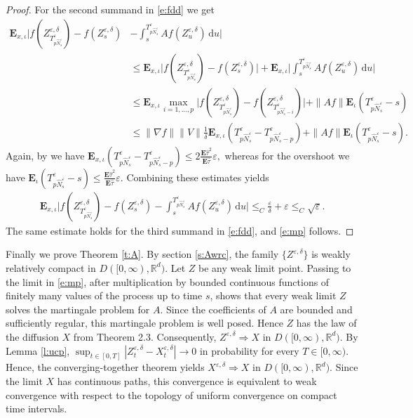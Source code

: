 \documentclass[10pt]{article}
\newcommand{\E}{\mathbf{E}}
\newcommand{\1}{1\!\!\!\;{\rm I}}
\theoremstyle{plain}
\theoremstyle{definition}
\newcommand{\e}{\varepsilon}
\newcommand{\ba}{\begin{equation}\begin{aligned}}
\newcommand{\ea}{\end{aligned}\end{equation}}
\newcommand{\di}{\mathrm{d}}
\newcommand{\bR}{\mathbb{R}}
\numberwithin{equation}{section}
\begin{document}
\begin{proof}
For the second summand in \eqref{e:fdd} we get
\ba
\E_{x,\iota}\Big|f(Z^{\e,\delta}_{T^\e_{p \widehat N^\e_s}}) - f(Z^{\e,\delta}_{s})
&- \int_{s}^{T^\e_{p \widehat N^\e_s}} Af(Z^{\e,\delta}_u)\,\di u\Big|\\
&\leq
\E_{x,\iota}\Big|f(Z^{\e,\delta}_{T^\e_{p \widehat N^\e_s}}) - f(Z^{\e,\delta}_s )\Big|
+\E_{x,\iota} \Big|\int_s^{T^\e_{p \widehat N^\e_s}} Af(Z^{\e,\delta}_u)\,\di u\Big|\\
&\leq
\E_{x,\iota}\max_{i=1,\dots,p}\Big|f(Z^{\e,\delta}_{T^\e_{p \widehat N^\e_s}}) - f(Z^{\e,\delta}_{T^\e_{p \widehat N^\e_s-i}} )\Big|
+\|Af\|\E_\iota (T^\e_{p \widehat N^\e_s}-s)\\
&\leq \|\nabla f\|\|V\|\frac{1}{\delta}\E_{x,\iota} (T^\e_{p \widehat N^\e_s}-T^\e_{p \widehat N^\e_s-p})
+\|Af\|\E_\iota (T^\e_{p \widehat N^\e_s}-s).
\ea
Again, by \cite[Section 2]{lorden1970excess} we have
$
\E_{x,\iota} (T^\e_{p \widehat N^\e_s}-T^\e_{p \widehat N^\e_s-p})\leq 2\frac{\E\widehat \tau^2}{\E \widehat \tau}\e,
$
whereas for the overshoot we have $\E_\iota (T^\e_{p \widehat N^\e_s}-s)\leq  \frac{\E\widehat \tau^2}{\E \widehat \tau} \e$.
Combining these estimates yields
\ba
\E_{x,\iota}\Big|f(Z^{\e,\delta}_{T^\e_{p \widehat N^\e_s}}) - f(Z^{\e,\delta}_{s})
- \int_{s}^{T^\e_{p \widehat N^\e_s}} Af(Z^{\e,\delta}_u)\,\di u\Big|\leq_C  \frac{\e}{\delta} +\e\leq_C\sqrt\e.
\ea
The same estimate holds for the third summand  in \eqref{e:fdd}, and \eqref{e:mp} follows.
\end{proof}

Finally we prove Theorem \ref{t:A}. By section \ref{s:Awrc}, the family $\{Z^{\e,\delta}\}$ is
weakly relatively compact in $D([0,\infty),\bR^d)$. Let $Z$ be any weak limit point.
Passing to the limit in \eqref{e:mp}, after multiplication by bounded continuous functions
of finitely many values of the process up to time $s$, shows that every weak limit $Z$
solves the martingale problem for $A$.
Since the coefficients of $A$ are bounded and sufficiently regular, this martingale problem is well posed.
Hence $Z$ has the law of the diffusion $X$ from Theorem 2.3. Consequently,
$Z^{\e,\delta} \Rightarrow X$ in $D([0,\infty),\bR^d)$.
By Lemma \ref{l:ucp},
$\sup_{t\in [0,T]}|Z^{\e,\delta}_t-X^{\e,\delta}_t|\to 0$ in probability for every $T\in[0,\infty)$.
Hence, the converging-together theorem yields $X^{\e,\delta} \Rightarrow X$ in $D([0,\infty),\bR^d)$.
Since the limit $X$ has continuous paths, this convergence is equivalent to weak convergence
with respect to the topology of uniform convergence on compact time intervals.
\end{document}
